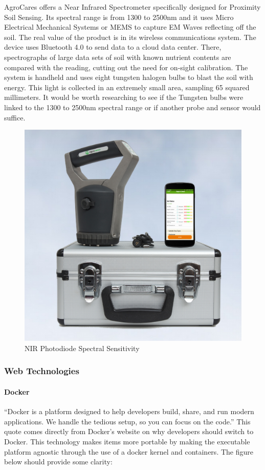 AgroCares offers a Near Infrared Spectrometer specifically designed for Proximity Soil Sensing. Its spectral range is from 1300 to 2500nm and it uses Micro Electrical Mechanical Systems or MEMS to capture EM Waves reflecting off the soil. The real value of the product is in its wireless communications system. The device uses Bluetooth 4.0 to send data to a cloud data center. There, spectrographs of large data sets of soil with known nutrient contents are compared with the reading, cutting out the need for on-sight calibration. The system is handheld and uses eight tungsten halogen bulbs to blast the soil with energy. This light is collected in an extremely small area, sampling 65 squared millimeters. It would be worth researching to see if the Tungsten bulbs were linked to the 1300 to 2500nm spectral range or if another probe and sensor would suffice.
\begin{figure}[H]
    \caption{NIR Photodiode Spectral Sensitivity}
    \centering
    \includegraphics[width=\textwidth]{images/3.2.2Pic.png}
\end{figure}

\subsubsection{Web Technologies}
\paragraph{Docker}
``Docker is a platform designed to help developers build, share, and run modern applications. We handle the tedious setup, so you can focus on the code.'' This quote comes directly from Docker's website on why developers should switch to Docker. This technology makes items more portable by making the executable platform agnostic through the use of a docker kernel and containers. The figure below should provide some clarity:

